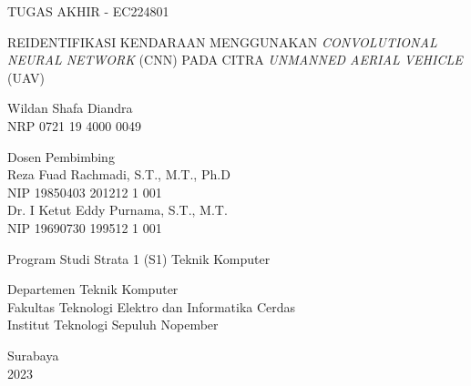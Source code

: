 \begin{large}
  TUGAS AKHIR - EC224801
\end{large}

\vspace{\fill}

\begin{spacing}{1}
  \justify\Large{
    REIDENTIFIKASI KENDARAAN MENGGUNAKAN \emph{CONVOLUTIONAL NEURAL NETWORK} (CNN)
    PADA CITRA \emph{UNMANNED AERIAL VEHICLE} (UAV)
  }
\end{spacing}

\vspace{\fill}

\begin{large}
  Wildan Shafa Diandra \\
  \textnormal{NRP 0721 19 4000 0049}
\end{large}

\vspace{\fill}

\begin{large}
  \textnormal{Dosen Pembimbing} \\
  Reza Fuad Rachmadi, S.T., M.T., Ph.D \\
  \textnormal{NIP 19850403 201212 1 001} \\
  Dr. I Ketut Eddy Purnama, S.T., M.T. \\
  \textnormal{NIP 19690730 199512 1 001}
\end{large}

\vspace{\fill}

Program Studi Strata 1 (S1) Teknik Komputer \\

\mdseries

Departemen Teknik Komputer \\
Fakultas Teknologi Elektro dan Informatika Cerdas \\
Institut Teknologi Sepuluh Nopember

Surabaya \\
2023

